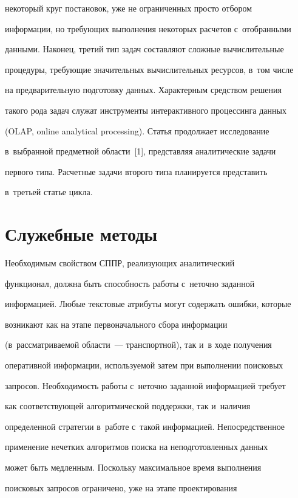 некоторый круг постановок, уже не ограниченных просто отбором 


информации, но требующих выполнения некоторых расчетов с~отобранными 


данными. Наконец, третий тип задач составляют сложные вычислительные 


процедуры, требующие значительных вычислительных ресурсов, в~том числе 


на предварительную подготовку данных. Характерным средством решения 


такого рода задач служат инструменты интерактивного процессинга данных 


(OLAP, online analytical processing). Статья продолжает исследование 


в~выбранной предметной области~[1], представляя аналитические задачи 


первого типа. Расчетные задачи второго типа планируется представить 


в~третьей статье цикла.


\section{Служебные методы}


      


      Необходимым свойством СППР, реализующих аналитический 


функционал, должна быть способность работы с~неточно заданной 


информацией. Любые текстовые атрибуты могут содержать ошибки, которые 


возникают как на этапе первоначального сбора информации 


(в~рассматриваемой области~--- транспортной), так и~в ходе получения 


оперативной информации, используемой затем при выполнении поисковых 


запросов. Необходимость работы с~неточно заданной информацией требует 


как соответствующей алгоритмической поддержки, так и~наличия 


определенной стратегии в~работе с~такой информацией. Непосредственное 


применение нечетких алгоритмов поиска на неподготовленных данных 


может быть медленным. Поскольку максимальное время выполнения 


поисковых запросов ограничено, уже на этапе проектирования 


